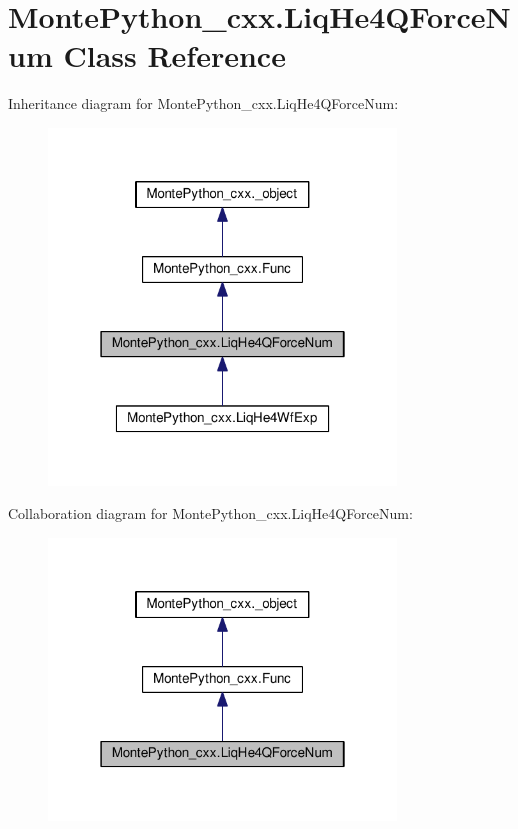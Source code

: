 \hypertarget{classMontePython__cxx_1_1LiqHe4QForceNum}{}\section{Monte\+Python\+\_\+cxx.\+Liq\+He4\+Q\+Force\+Num Class Reference}
\label{classMontePython__cxx_1_1LiqHe4QForceNum}


Inheritance diagram for Monte\+Python\+\_\+cxx.\+Liq\+He4\+Q\+Force\+Num\+:
\nopagebreak
\begin{figure}[H]
\begin{center}
\leavevmode
\includegraphics[width=262pt]{classMontePython__cxx_1_1LiqHe4QForceNum__inherit__graph}
\end{center}
\end{figure}


Collaboration diagram for Monte\+Python\+\_\+cxx.\+Liq\+He4\+Q\+Force\+Num\+:
\nopagebreak
\begin{figure}[H]
\begin{center}
\leavevmode
\includegraphics[width=262pt]{classMontePython__cxx_1_1LiqHe4QForceNum__coll__graph}
\end{center}
\end{figure}
